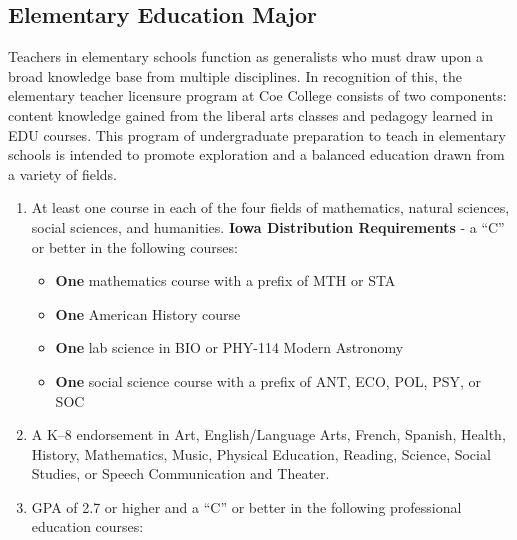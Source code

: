 \documentclass[
  letterpaper,
]{scrbook}
\providecommand{\tightlist}{%
  \setlength{\itemsep}{0pt}\setlength{\parskip}{0pt}}
\begin{document}
\subsection{Elementary Education
Major}\label{elementary-education-major}

Teachers in elementary schools function as generalists who must draw
upon a broad knowledge base from multiple disciplines. In recognition of
this, the elementary teacher licensure program at Coe College consists
of two components: content knowledge gained from the liberal arts
classes and pedagogy learned in EDU courses. This program of
undergraduate preparation to teach in elementary schools is intended to
promote exploration and a balanced education drawn from a variety of
fields.

\begin{enumerate}
\def\labelenumi{\arabic{enumi}.}
\item
  At least one course in each of the four fields of mathematics, natural
  sciences, social sciences, and humanities. \textbf{Iowa Distribution
  Requirements} - a ``C'' or better in the following courses:

  \begin{itemize}
  \tightlist
  \item
    \textbf{One} mathematics course with a prefix of MTH or STA
  \item
    \textbf{One} American History course
  \item
    \textbf{One} lab science in BIO or PHY-114 Modern Astronomy
  \item
    \textbf{One} social science course with a prefix of ANT, ECO, POL,
    PSY, or SOC
  \end{itemize}
\item
  A K--8 endorsement in Art, English/Language Arts, French, Spanish,
  Health, History, Mathematics, Music, Physical Education, Reading,
  Science, Social Studies, or Speech Communication and Theater.
\item
  GPA of 2.7 or higher and a ``C'' or better in the following
  professional education courses:


\end{enumerate}
\end{document}
